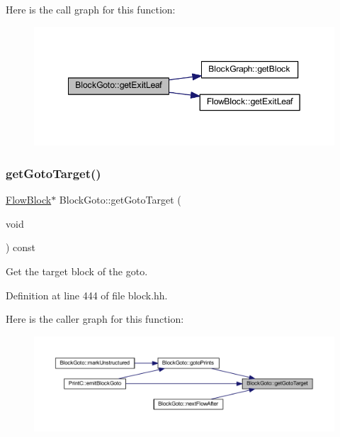 Here is the call graph for this function\+:
\nopagebreak
\begin{figure}[H]
\begin{center}
\leavevmode
\includegraphics[width=349pt]{class_block_goto_a18080132d5cd3398eb972335368359e2_cgraph}
\end{center}
\end{figure}
\mbox{\label{class_block_goto_adc0965cdd2ec23445ad156cd2374d6ea}} 
\subsubsection{\texorpdfstring{getGotoTarget()}{getGotoTarget()}}
{\footnotesize\ttfamily \mbox{\hyperlink{class_flow_block}{Flow\+Block}}$\ast$ Block\+Goto\+::get\+Goto\+Target (\begin{DoxyParamCaption}\item[{void}]{ }\end{DoxyParamCaption}) const\hspace{0.3cm}{\ttfamily [inline]}}



Get the target block of the goto. 



Definition at line 444 of file block.\+hh.

Here is the caller graph for this function\+:
\nopagebreak
\begin{figure}[H]
\begin{center}
\leavevmode
\includegraphics[width=350pt]{class_block_goto_adc0965cdd2ec23445ad156cd2374d6ea_icgraph}
\end{center}
\end{figure}
\mbox{\label{class_block_goto_a89799c641a761f1cde85273610a20dfd}} 
